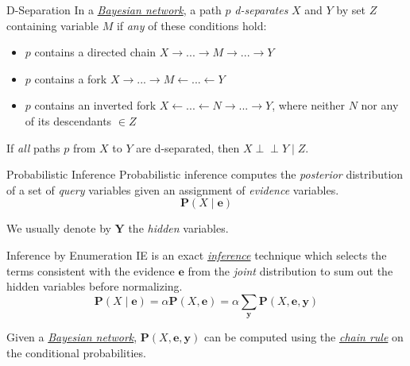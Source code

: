 \documentclass{cognito}
\begin{document}
\begin{note}{D-Separation}
	In a \hyperref[note:Bayesian Networks]{\it Bayesian network},
	a path $p$ \emph{d-separates} $X$ and $Y$ by set $Z$ containing variable $M$ if \emph{any} of these conditions hold:
	\begin{itemize}
		\item $p$ contains a directed chain $X \to ... \to M \to ... \to Y$
		\item $p$ contains a fork $X \to ... \to M \leftarrow ... \leftarrow Y$
		\item $p$ contains an inverted fork $X \leftarrow ... \leftarrow N \to ... \to Y$, where neither $N$ nor any of its descendants $\in Z$
	\end{itemize}
	If \emph{all} paths $p$ from $X$ to $Y$ are d-separated, then $X \perp \!\!\!\! \perp Y \mid Z$.
\end{note}


\begin{note}{Probabilistic Inference}
	Probabilistic inference computes the \emph{posterior} distribution of a set of \emph{query} variables
	given an assignment of \emph{evidence} variables.
	$$
		\mathbf{P}(X\mid \mathbf{e})
	$$
	\begin{remark} We usually denote by $\mathbf{Y}$ the \emph{hidden} variables. \end{remark}
	\vspace{-5pt}
\end{note}

\begin{note}{Inference by Enumeration}
	IE is an exact \hyperref[note:Probabilistic Inference]{\it inference} technique which
	selects the terms consistent with the evidence $\mathbf{e}$ from the \emph{joint} distribution to sum out the hidden variables before normalizing.
	$$
		\textstyle \mathbf{P}(X\mid \mathbf{e}) = \alpha \mathbf{P}(X, \mathbf{e}) = \alpha \sum_\mathbf{y} \mathbf{P}(X, \mathbf{e}, \mathbf{y}) 
	$$
	\begin{remark} Given a \hyperref[note:Bayesian Networks]{\emph{Bayesian network}}, $\mathbf{P}(X, \mathbf{e}, \mathbf{y})$
	can be computed using the \hyperref[note:Chain Rule]{\it chain rule} on the conditional probabilities.
	\end{remark}
	\vspace{-5pt}
\end{note}
\end{document}
